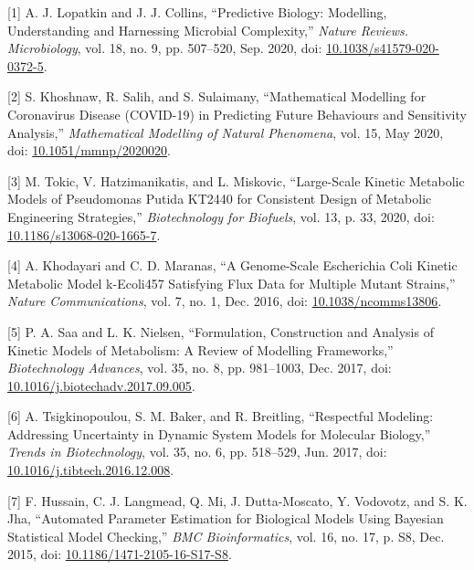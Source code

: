 \documentclass[11pt]{article}
\begin{document}
\hypertarget{citeproc_bib_item_1}{[1] A. J. Lopatkin and J. J. Collins, “Predictive Biology: Modelling, Understanding and Harnessing Microbial Complexity,” \textit{Nature Reviews. Microbiology}, vol. 18, no. 9, pp. 507–520, Sep. 2020, doi: \href{https://doi.org/10.1038/s41579-020-0372-5}{10.1038/s41579-020-0372-5}.}

\hypertarget{citeproc_bib_item_2}{[2] S. Khoshnaw, R. Salih, and S. Sulaimany, “Mathematical Modelling for Coronavirus Disease (COVID-19) in Predicting Future Behaviours and Sensitivity Analysis,” \textit{Mathematical Modelling of Natural Phenomena}, vol. 15, May 2020, doi: \href{https://doi.org/10.1051/mmnp/2020020}{10.1051/mmnp/2020020}.}

\hypertarget{citeproc_bib_item_3}{[3] M. Tokic, V. Hatzimanikatis, and L. Miskovic, “Large-Scale Kinetic Metabolic Models of Pseudomonas Putida KT2440 for Consistent Design of Metabolic Engineering Strategies,” \textit{Biotechnology for Biofuels}, vol. 13, p. 33, 2020, doi: \href{https://doi.org/10.1186/s13068-020-1665-7}{10.1186/s13068-020-1665-7}.}

\hypertarget{citeproc_bib_item_4}{[4] A. Khodayari and C. D. Maranas, “A Genome-Scale Escherichia Coli Kinetic Metabolic Model k-Ecoli457 Satisfying Flux Data for Multiple Mutant Strains,” \textit{Nature Communications}, vol. 7, no. 1, Dec. 2016, doi: \href{https://doi.org/10.1038/ncomms13806}{10.1038/ncomms13806}.}

\hypertarget{citeproc_bib_item_5}{[5] P. A. Saa and L. K. Nielsen, “Formulation, Construction and Analysis of Kinetic Models of Metabolism: A Review of Modelling Frameworks,” \textit{Biotechnology Advances}, vol. 35, no. 8, pp. 981–1003, Dec. 2017, doi: \href{https://doi.org/10.1016/j.biotechadv.2017.09.005}{10.1016/j.biotechadv.2017.09.005}.}

\hypertarget{citeproc_bib_item_6}{[6] A. Tsigkinopoulou, S. M. Baker, and R. Breitling, “Respectful Modeling: Addressing Uncertainty in Dynamic System Models for Molecular Biology,” \textit{Trends in Biotechnology}, vol. 35, no. 6, pp. 518–529, Jun. 2017, doi: \href{https://doi.org/10.1016/j.tibtech.2016.12.008}{10.1016/j.tibtech.2016.12.008}.}

\hypertarget{citeproc_bib_item_7}{[7] F. Hussain, C. J. Langmead, Q. Mi, J. Dutta-Moscato, Y. Vodovotz, and S. K. Jha, “Automated Parameter Estimation for Biological Models Using Bayesian Statistical Model Checking,” \textit{BMC Bioinformatics}, vol. 16, no. 17, p. S8, Dec. 2015, doi: \href{https://doi.org/10.1186/1471-2105-16-S17-S8}{10.1186/1471-2105-16-S17-S8}.}
\end{document}
